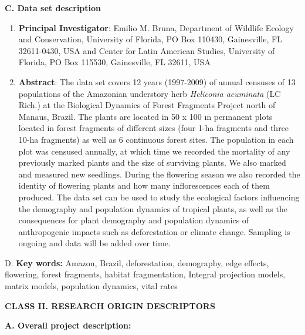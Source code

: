 \documentclass[
  english,
  man]{apa6}
\begin{document}
\noindent 
\textbf{C. Data set description}

\begin{enumerate}
\def\labelenumi{\arabic{enumi}.}
\item
  \textbf{Principal Investigator}: Emilio M. Bruna, Department of Wildlife Ecology and Conservation, University of Florida, PO Box 110430, Gainesville, FL 32611-0430, USA and Center for Latin American Studies, University of Florida, PO Box 115530, Gainesville, FL 32611, USA
\item
  \textbf{Abstract}: The data set covers 12 years (1997-2009) of annual
  censuses of 13 populations of the Amazonian understory herb \emph{Heliconia
  acuminata} (LC Rich.) at the Biological Dynamics of Forest Fragments
  Project north of Manaus, Brazil. The plants are located in 50 x 100 m
  permanent plots located in forest fragments of different sizes (four
  1-ha fragments and three 10-ha fragments) as well as 6 continuous forest
  sites. The population in each plot was censused annually, at which time
  we recorded the mortality of any previously marked plants and the size
  of surviving plants. We also marked and measured new seedlings. During
  the flowering season we also recorded the identity of flowering plants
  and how many inflorescences each of them produced. The data set can be
  used to study the ecological factors influencing the demography and
  population dynamics of tropical plants, as well as the consequences for
  plant demography and population dynamics of anthropogenic impacts such
  as deforestation or climate change. Sampling is ongoing and data will be
  added over time.
\end{enumerate}

\noindent  
D. \textbf{Key words:} Amazon, Brazil, deforestation, demography,
edge effects, flowering, forest fragments, habitat fragmentation,
Integral projection models, matrix models, population dynamics, vital
rates

\noindent 
\textbf{CLASS II. RESEARCH ORIGIN DESCRIPTORS}

\noindent  
\textbf{A. Overall project description:}
\end{document}
